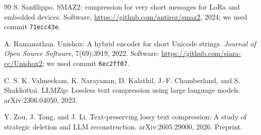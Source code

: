 \documentclass[11pt]{article}
\begin{document}
\begin{thebibliography}{99}
S. Sanfilippo.
SMAZ2: compression for very short messages for LoRa and embedded devices.
Software, \url{https://github.com/antirez/smaz2}, 2024; we used commit \texttt{71ecc43e}.

A. Ramanathan.
Unishox: A hybrid encoder for short Unicode strings.
\emph{Journal of Open Source Software}, 7(69):3919, 2022.
Software: \url{https://github.com/siara-cc/Unishox2}; we used commit \texttt{6ec2ff07}.

C. S. K. Valmeekam, K. Narayanan, D. Kalathil, J.-F. Chamberland, and S. Shakkottai.
LLMZip: Lossless text compression using large language models.
arXiv:2306.04050, 2023.

Y. Zou, J. Tong, and J. Li.
Text-preserving lossy text compression: A study of strategic deletion and LLM reconstruction.
arXiv:2605.29000, 2026. Preprint.

\end{thebibliography}
\end{document}
